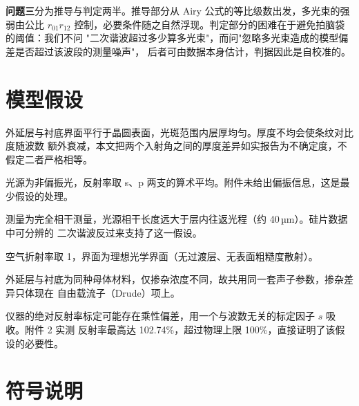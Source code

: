 \documentclass[12pt]{article}
\begin{document}
\textbf{问题三}分为推导与判定两半。推导部分从 Airy 公式的等比级数出发，多光束的强弱由公比
$r_{01}r_{12}$ 控制，必要条件随之自然浮现。判定部分的困难在于避免拍脑袋的阈值：我们不问
"二次谐波超过多少算多光束"，而问"忽略多光束造成的模型偏差是否超过该波段的测量噪声"，
后者可由数据本身估计，判据因此是自校准的。

\section{模型假设}

\begin{modelassumptions}
  \item 外延层与衬底界面平行于晶圆表面，光斑范围内层厚均匀。厚度不均会使条纹对比度随波数
        额外衰减，本文把两个入射角之间的厚度差异如实报告为不确定度，不假定二者严格相等。
  \item 光源为非偏振光，反射率取 s、p 两支的算术平均。附件未给出偏振信息，这是最少假设的处理。
  \item 测量为完全相干测量，光源相干长度远大于层内往返光程（约 40\,µm）。硅片数据中可分辨的
        二次谐波反过来支持了这一假设。
  \item 空气折射率取 1，界面为理想光学界面（无过渡层、无表面粗糙度散射）。
  \item 外延层与衬底为同种母体材料，仅掺杂浓度不同，故共用同一套声子参数，掺杂差异只体现在
        自由载流子（Drude）项上。
  \item 仪器的绝对反射率标定可能存在乘性偏差，用一个与波数无关的标定因子 $s$ 吸收。附件 2 实测
        反射率最高达 102.74\%，超过物理上限 100\%，直接证明了该假设的必要性。
\end{modelassumptions}

\section{符号说明}
\end{document}
